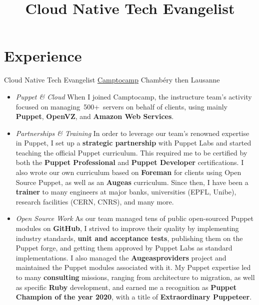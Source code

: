 \documentclass[11pt,a4paper,nolmodern]{moderncv}
\title{Cloud Native Tech Evangelist}
\begin{document}
\setmainfont{Minion Pro}
\setsansfont{Myriad Pro}

\maketitle


\section{Experience}

          {Cloud Native Tech Evangelist}
          {\href{http://www.camptocamp.com}{Camptocamp}}
          {Chambéry then Lausanne}
          {}
          {
  \begin{itemize}
    \item \emph{Puppet \& Cloud}\newline
      When I joined Camptocamp, the instructure team's activity focused on
      managing 500+ servers on behalf of clients, using mainly \textbf{Puppet}, \textbf{OpenVZ}, and \textbf{Amazon Web Services}.
    \item \emph{Partnerships \& Training}\newline
      In order to leverage our team's renowned expertise in Puppet,
      I set up a \textbf{strategic partnership} with Puppet Labs and started teaching the official
      Puppet curriculum. This required me to be certified by both the \textbf{Puppet Professional} and \textbf{Puppet Developer} certifications.
      I also wrote our own curriculum based on \textbf{Foreman} for clients using Open Source Puppet, 
      as well as an \textbf{Augeas} curriculum.\newline
      Since then, I have been a \textbf{trainer} to many engineers at major banks, universities (EPFL, Unibe), research facilities (CERN, CNRS), and many more.
    \item \emph{Open Source Work}\newline
      As our team managed tens of public open-sourced Puppet modules on \textbf{GitHub}, I strived to improve their quality
      by implementing industry standards, \textbf{unit and acceptance tests}, publishing them on the Puppet forge, and getting them approved by Puppet Labs as standard implementations. I also managed the \textbf{Augeasproviders} project and maintained the Puppet modules associated with it.
      My Puppet expertise led to many \textbf{consulting} missions, ranging from architecture to migration,
      as well as specific \textbf{Ruby} development, and earned me a recognition as \textbf{Puppet Champion of the year 2020}, with a title of \textbf{Extraordinary Puppeteer}.

\end{itemize}}
\end{document}

